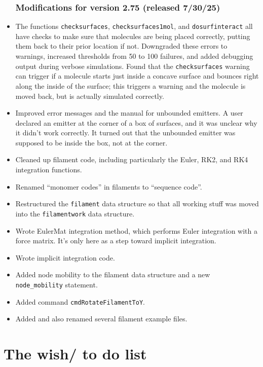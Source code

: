 \documentclass {scrbook}
\newcommand {\ttt} {\texttt}
\begin{document}
\begin{itemize}
\subsection{Modifications for version 2.75 (released 7/30/25)}
\item The functions \ttt{checksurfaces}, \ttt{checksurfaces1mol}, and \ttt{dosurfinteract} all have checks to make sure that molecules are being placed correctly, putting them back to their prior location if not. Downgraded these errors to warnings, increased thresholds from 50 to 100 failures, and added debugging output during verbose simulations. Found that the \ttt{checksurfaces} warning can trigger if a molecule starts just inside a concave surface and bounces right along the inside of the surface; this triggers a warning and the molecule is moved back, but is actually simulated correctly.
\item Improved error messages and the manual for unbounded emitters. A user declared an emitter at the corner of a box of surfaces, and it was unclear why it didn't work correctly. It turned out that the unbounded emitter was supposed to be inside the box, not at the corner.
\item Cleaned up filament code, including particularly the Euler, RK2, and RK4 integration functions.
\item Renamed ``monomer codes'' in filaments to ``sequence code''.
\item Restructured the \ttt{filament} data structure so that all working stuff was moved into the \ttt{filamentwork} data structure.
\item Wrote EulerMat integration method, which performs Euler integration with a force matrix. It's only here as a step toward implicit integration.
\item Wrote implicit integration code.
\item Added node mobility to the filament data structure and a new \ttt{node\_mobility} statement.
\item Added command \ttt{cmdRotateFilamentToY}.
\item Added and also renamed several filament example files.

\end{itemize}


\chapter{The wish/ to do list}

\end{document}
